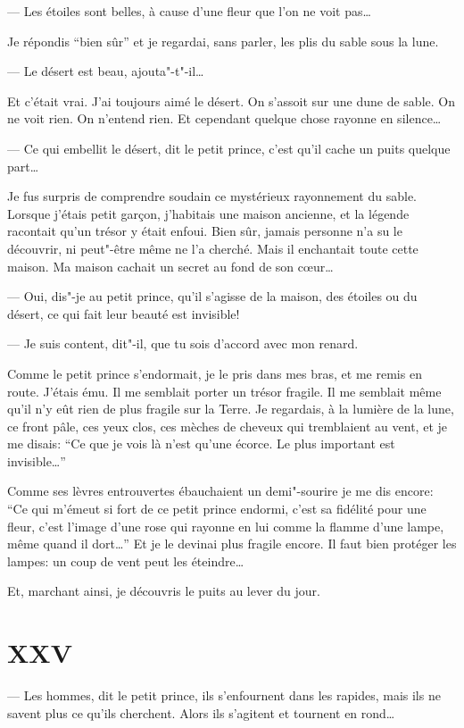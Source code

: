 --- Les étoiles sont belles, à cause d'une fleur que l'on ne voit pas\ldots{}

Je répondis ``bien sûr'' et je regardai, sans parler, les plis du sable sous la lune.

--- Le désert est beau, ajouta"-t"-il\ldots{}

Et c'était vrai. J'ai toujours aimé le désert. On s'assoit sur une dune de sable. On
ne voit rien. On n'entend rien. Et cependant quelque chose rayonne en silence\ldots{}

--- Ce qui embellit le désert, dit le petit prince, c'est qu'il cache un puits
quelque part\ldots{}

Je fus surpris de comprendre soudain ce mystérieux rayonnement du sable. Lorsque
j'étais petit garçon, j'habitais une maison ancienne, et la légende racontait qu’un
trésor y était enfoui. Bien sûr, jamais personne n'a su le découvrir, ni peut"-être
même ne l'a cherché. Mais il enchantait toute cette maison. Ma maison cachait un
secret au fond de son cœur\ldots{}

--- Oui, dis"-je au petit prince, qu'il s'agisse de la maison, des étoiles ou du
désert, ce qui fait leur beauté est invisible!

--- Je suis content, dit"-il, que tu sois d'accord avec mon renard.

Comme le petit prince s'endormait, je le pris dans mes bras, et me remis en route.
J'étais ému. Il me semblait porter un trésor fragile. Il me semblait même qu'il n'y
eût rien de plus fragile sur la Terre. Je regardais, à la lumière de la lune, ce
front pâle, ces yeux clos, ces mèches de cheveux qui tremblaient au vent, et je me
disais: ``Ce que je vois là n'est qu'une écorce. Le plus important est invisible\ldots{}''

Comme ses lèvres entrouvertes ébauchaient un demi"-sourire je me dis encore: ``Ce qui
m'émeut si fort de ce petit prince endormi, c'est sa fidélité pour une fleur, c'est
l'image d’une rose qui rayonne en lui comme la flamme d'une lampe, même quand il
dort\ldots{}'' Et je le devinai plus fragile encore. Il faut bien protéger les lampes:
un coup de vent peut les éteindre\ldots{}

Et, marchant ainsi, je découvris le puits au lever du jour.

\section{XXV}
--- Les hommes, dit le petit prince, ils s'enfournent dans les rapides, mais ils ne
savent plus ce qu'ils cherchent. Alors ils s'agitent et tournent en rond\ldots{}

